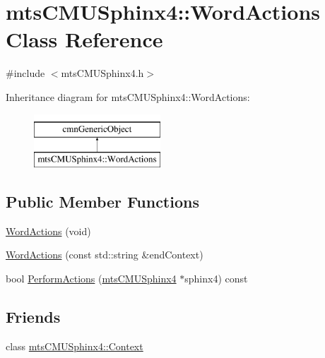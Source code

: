 \hypertarget{classmts_c_m_u_sphinx4_1_1_word_actions}{}\section{mts\+C\+M\+U\+Sphinx4\+:\+:Word\+Actions Class Reference}
\label{classmts_c_m_u_sphinx4_1_1_word_actions}


{\ttfamily \#include $<$mts\+C\+M\+U\+Sphinx4.\+h$>$}

Inheritance diagram for mts\+C\+M\+U\+Sphinx4\+:\+:Word\+Actions\+:\begin{figure}[H]
\begin{center}
\leavevmode
\includegraphics[height=2.000000cm]{dd/dad/classmts_c_m_u_sphinx4_1_1_word_actions}
\end{center}
\end{figure}
\subsection*{Public Member Functions}
\begin{DoxyCompactItemize}
\item 
\hyperlink{classmts_c_m_u_sphinx4_1_1_word_actions_aa58deb353866af6d9515b58593c56aaa}{Word\+Actions} (void)
\item 
\hyperlink{classmts_c_m_u_sphinx4_1_1_word_actions_ad754ad85c076548d99840b48602953ae}{Word\+Actions} (const std\+::string \&end\+Context)
\item 
bool \hyperlink{classmts_c_m_u_sphinx4_1_1_word_actions_a72eda95436b175043bfd8291824b81a8}{Perform\+Actions} (\hyperlink{classmts_c_m_u_sphinx4}{mts\+C\+M\+U\+Sphinx4} $\ast$sphinx4) const 
\end{DoxyCompactItemize}
\subsection*{Friends}
\begin{DoxyCompactItemize}
\item 
class \hyperlink{classmts_c_m_u_sphinx4_1_1_word_actions_af6840ef284029e7e225d11062c8615e3}{mts\+C\+M\+U\+Sphinx4\+::\+Context}
\end{DoxyCompactItemize}


